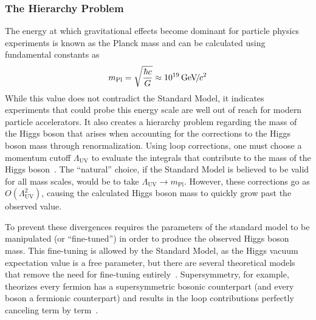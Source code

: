\subsubsection{The Hierarchy Problem} \label{sec:hierarchy}
The energy at which gravitational effects become dominant for particle physics experiments is known as the Planck mass and can be calculated using fundamental constants as
\begin{equation}
	m_\text{Pl}=\sqrt{\frac{\hbar c}{G}}\approx10^{19}{\,\text{Ge\hspace{-.08em}V\hspace{-0.16em}/\hspace{-0.08em}}c^\text{2}}
\end{equation}
While this value does not contradict the Standard Model, it indicates experiments that could probe this energy scale are well out of reach for modern particle accelerators. It also creates a hierarchy problem regarding the mass of the Higgs boson that arises when accounting for the corrections to the Higgs boson mass through renormalization. Using loop corrections, one must choose a momentum cutoff $\Lambda_\text{UV}$ to evaluate the integrals that contribute to the mass of the Higgs boson~\cite{Peskin:1995ev}. The ``natural'' choice, if the Standard Model is believed to be valid for all mass scales, would be to take $\Lambda_\text{UV}\to m_\text{Pl}$. However, these corrections go as $O(\Lambda_\text{UV}^2)$, causing the calculated Higgs boson mass to quickly grow past the observed value.

To prevent these divergences requires the parameters of the standard model to be manipulated (or ``fine-tuned'') in order to produce the observed Higgs boson mass. This fine-tuning is allowed by the Standard Model, as the Higgs vacuum expectation value is a free parameter, but there are several theoretical models that remove the need for fine-tuning entirely~\cite{hierarchy}. Supersymmetry, for example, theorizes every fermion has a supersymmetric bosonic counterpart (and every boson a fermionic counterpart) and results in the loop contributions perfectly canceling term by term~\cite{susy}.


